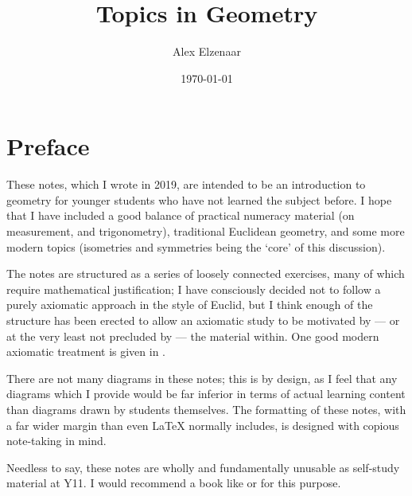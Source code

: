 \documentclass[a4paper]{report}
\title{Topics in Geometry}
\author{Alex Elzenaar}
\date{\today}
\theoremstyle{definition}
\begin{document}
  \maketitle

  \clearpage
  \thispagestyle{plain}
  \par{}

  \tableofcontents

  \clearpage
  \chapter*{Preface}
  These notes, which I wrote in 2019, are intended to be an introduction to geometry for younger students who have not learned the subject
  before. I hope that I have included a good balance of practical numeracy material (on measurement, and trigonometry), traditional Euclidean geometry,
  and some more modern topics (isometries and symmetries being the `core' of this discussion).

  The notes are structured as a series of loosely connected exercises, many of which require mathematical justification; I have consciously
  decided not to follow a purely axiomatic approach in the style of Euclid, but I think enough of the structure has been erected to allow
  an axiomatic study to be motivated by --- or at the very least not precluded by --- the material within. One good modern axiomatic treatment
  is given in \autocite{lee}.

  There are not many diagrams in these notes; this is by design, as I feel that any diagrams which I provide would be far inferior in terms of actual
  learning content than diagrams drawn by students themselves. The formatting of these notes, with a far wider margin than even \LaTeX{} normally
  includes, is designed with copious note-taking in mind.

  Needless to say, these notes are wholly and fundamentally unusable as self-study material at Y11. I would recommend a book like \autocite{lang}
  or \autocite{birkhoff} for this purpose.
\end{document}
